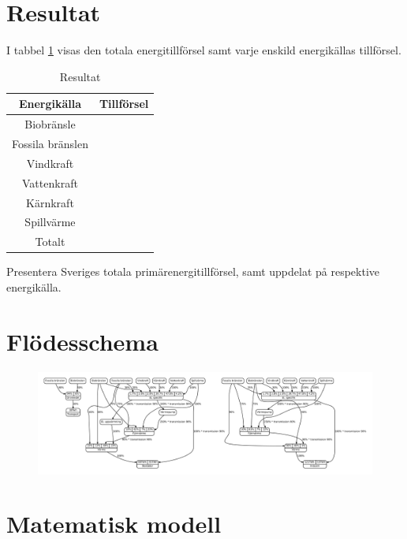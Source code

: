 \documentclass[a4paper,11pt,fleqn]{article}
\begin{document}
\newpage

\section{Resultat}

I tabbel \ref{resultat} visas den totala energitillförsel samt varje enskild energikällas tillförsel.
\begin{table}[h!]
	\centering
	\begin{tabular}{||c c||}
		\hline
		Energikälla & Tillförsel \\
		\hline
		\hline
		Biobränsle & \\
		Fossila bränslen & \\
		Vindkraft & \\
		Vattenkraft & \\
		Kärnkraft & \\
		Spillvärme & \\
		\hline
		\hline
		Totalt & \\
		\hline
	\end{tabular}
	\caption{Resultat}
	\label{resultat}
\end{table}

Presentera Sveriges totala primärenergitillförsel, samt uppdelat på
respektive energikälla.

\appendix
\section{Flödesschema}
\begin{figure}[h!]
	\centering 
 		\includegraphics[scale = 0.2]{diagram.pdf}
		\label{diagram}
\end{figure}
\section {Matematisk modell}
\end{document}
